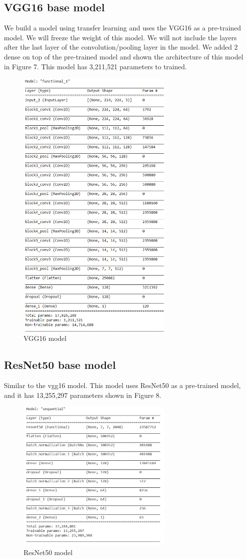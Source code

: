 \documentclass{article}
\begin{document}
\subsection{VGG16 base model}
We build a model using transfer learning and uses the VGG16\cite{simonyan2014very} as a pre-trained model. We will freeze the weight of this model. We will not include the layers after the last layer of the convolution/pooling layer in the model. We added 2 dense on top of the pre-trained model and shown the architecture of this model in Figure 7. This model has 3,211,521 parameters to trained.
\begin{figure}[H]
 \centering
    \includegraphics[width=3.0in]{figs/vggmodel}
    \caption{VGG16 model}
\end{figure} 

\subsection{ResNet50 base model}
Similar to the vgg16 model. This model uses ResNet50 as a pre-trained model, and it has 13,255,297 parameters shown in Figure 8.
\begin{figure}[H]
 \centering
    \includegraphics[width=3.0in]{figs/resnetmodel}
    \caption{ResNet50 model}
\end{figure} 
\end{document}
